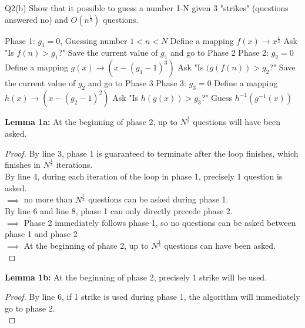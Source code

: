 \begin{problem}
  {Q2(b)}
  Show that it possible to guess a number 1-N given 3 "strikes" (questions answered no) and $O(n^{\frac{1}{3}})$ questions. \\
  \begin{algorithmic}[1]
    \STATE Phase 1: $g_1 = 0$, Guessing number $1 < n < N$
    \STATE Define a mapping $f(x) \rightarrow x^{\frac{1}{3}}$
    \STATE Ask "Is $f(n) > g_1$?"
    \STATE Save the current value of $g_1$ and go to Phase 2
    \ENDIF
    \ENDFOR
    \STATE Phase 2: $g_2 = 0$
    \STATE Define a mapping $g(x) \rightarrow (x - (g_1 - 1)^3)$
    \STATE Ask "Is $(g(f(n)) > g_2$?"
    \STATE Save the current value of $g_2$ and go to Phase 3
    \ENDIF
    \ENDFOR
    \STATE Phase 3: $g_3 = 0$
    \STATE Define a mapping $h(x) \rightarrow (x - (g_2 - 1)^2)$
    \STATE Ask "Is $h(g(x)) > g_3$?"
    \STATE Guess $h^{-1}(g^{-1}(x))$
    \ENDIF
    \ENDFOR
  \end{algorithmic}
  \textbf{Lemma 1a:} At the beginning of phase 2, up to $N^{\frac{1}{3}}$ questions will have been asked. \\
  \begin{proof}
    By line 3, phase 1 is guaranteed to terminate after the loop finishes, which finishes in $N^{\frac{1}{3}}$ iterations. \\
    By line 4, during each iteration of the loop in phase 1, precisely 1 question is asked. \\
    $\implies $ no more than $N^{\frac{1}{3}}$ questions can be asked during phase 1. \\
    By line 6 and line 8, phase 1 can only directly precede phase 2. \\
    $\implies $ Phase 2 immediately follows phase 1, so no questions can be asked between phase 1 and phase 2 \\
    $\implies $ At the beginning of phase 2, up to $N^{\frac{1}{3}}$ questions can have been asked. \\
  \end{proof}
  \textbf{Lemma 1b:} At the beginning of phase 2, precisely 1 strike will be used. \\
  \begin{proof}
    By line 6, if 1 strike is used during phase 1, the algorithm will immediately go to phase 2. \\

\end{proof}
\end{problem}
